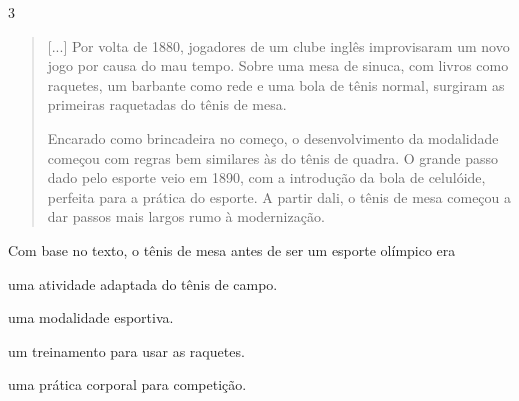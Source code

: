 \num{3}
\begin{quote}
  {[}...{]} Por volta de 1880, jogadores de um clube inglês improvisaram
  um novo jogo por causa do mau tempo. Sobre uma mesa de sinuca, com
  livros como raquetes, um barbante como rede e uma bola de tênis
  normal, surgiram as primeiras raquetadas do tênis de mesa.

Encarado como brincadeira no começo, o desenvolvimento da modalidade
começou com regras bem similares às do tênis de quadra. O grande passo
dado pelo esporte veio em 1890, com a introdução da bola de celulóide,
perfeita para a prática do esporte. A partir dali, o tênis de mesa
começou a dar passos mais largos rumo à modernização.

\end{quote}

Com base no texto, o tênis de mesa antes de ser um esporte olímpico era

\begin{escolha}
\item uma atividade adaptada do tênis de campo.

\item uma modalidade esportiva.

\item um treinamento para usar as raquetes.

\item uma prática corporal para competição.
\end{escolha}


